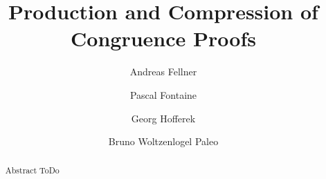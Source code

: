 \documentclass[a4paper,11pt]{article}
\begin{document}
\title{Production and Compression of Congruence Proofs}

\author{Andreas Fellner
   \and Pascal Fontaine
   \and Georg Hofferek
   \and Bruno Woltzenlogel Paleo
}

\date{}


\maketitle

\begin{abstract}
Abstract ToDo

\end{abstract}


\label{sec:proofcompression}























\end{document}
